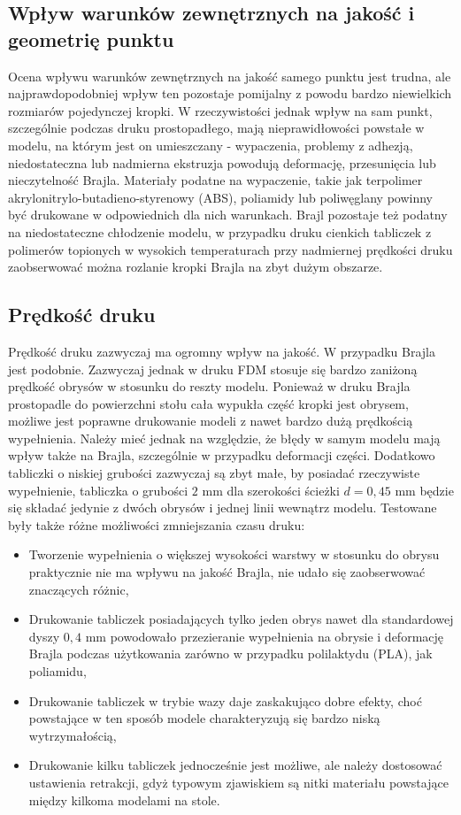\documentclass[12pt,a4paper]{article}
\begin{document}
\subsection{Wpływ warunków zewnętrznych na jakość i geometrię punktu}
Ocena wpływu warunków zewnętrznych na jakość samego punktu jest trudna, ale najprawdopodobniej wpływ ten pozostaje pomijalny z powodu bardzo niewielkich rozmiarów pojedynczej kropki. W rzeczywistości jednak wpływ na sam punkt, szczególnie podczas druku prostopadłego, mają nieprawidłowości powstałe w modelu, na którym jest on umieszczany - wypaczenia, problemy z adhezją, niedostateczna lub nadmierna ekstruzja powodują deformację, przesunięcia lub nieczytelność Brajla.
Materiały podatne na wypaczenie, takie jak terpolimer akrylonitrylo-butadieno-styrenowy (ABS), poliamidy lub poliwęglany powinny być drukowane w odpowiednich dla nich warunkach. Brajl pozostaje też podatny na niedostateczne chłodzenie modelu, w przypadku druku cienkich tabliczek z polimerów topionych w wysokich temperaturach przy nadmiernej prędkości druku zaobserwować można rozlanie kropki Brajla na zbyt dużym obszarze.

\subsection{Prędkość druku}
Prędkość druku zazwyczaj ma ogromny wpływ na jakość. W przypadku Brajla jest podobnie.
Zazwyczaj jednak w druku FDM stosuje się bardzo zaniżoną prędkość obrysów w stosunku do reszty modelu. Ponieważ w druku Brajla prostopadle do powierzchni stołu cała wypukła część kropki jest obrysem, możliwe jest poprawne drukowanie modeli z nawet bardzo dużą prędkością wypełnienia. Należy mieć jednak na względzie, że błędy w samym modelu mają wpływ także na Brajla, szczególnie w przypadku deformacji części. Dodatkowo tabliczki o niskiej grubości zazwyczaj są zbyt małe, by posiadać rzeczywiste wypełnienie, tabliczka o grubości $2 \text{ mm}$ dla szerokości ścieżki $d=0{,}45 \text{ mm}$ będzie się składać jedynie z dwóch obrysów i jednej linii wewnątrz modelu.
Testowane były także różne możliwości zmniejszania czasu druku:
\begin{itemize}
\item Tworzenie wypełnienia o większej wysokości warstwy w stosunku do obrysu praktycznie nie ma wpływu na jakość Brajla, nie udało się zaobserwować znaczących różnic,
\item Drukowanie tabliczek posiadających tylko jeden obrys nawet dla standardowej dyszy $0{,}4 \text{ mm}$ powodowało przezieranie wypełnienia na obrysie i deformację Brajla podczas użytkowania zarówno w przypadku polilaktydu (PLA), jak poliamidu,
\item Drukowanie tabliczek w trybie wazy daje zaskakująco dobre efekty, choć powstające w ten sposób modele charakteryzują się bardzo niską wytrzymałością,
\item Drukowanie kilku tabliczek jednocześnie jest możliwe, ale należy dostosować ustawienia retrakcji, gdyż typowym zjawiskiem są nitki materiału powstające między kilkoma modelami na stole.
\end{itemize}
\end{document}
